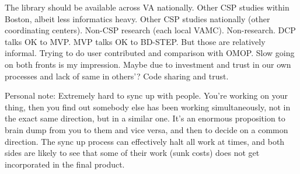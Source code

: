 \documentclass{tufte-handout}
\begin{document}
The library should be available across VA nationally. Other CSP
studies within Boston, albeit less informatics heavy. Other CSP
studies nationally (other coordinating centers). Non-CSP research
(each local VAMC). Non-research. DCP talks OK to MVP. MVP talks OK to
BD-STEP. But those are relatively informal. Trying to do user
contributed and comparison with OMOP. Slow going on both fronts is my
impression. Maybe due to investment and trust in our own processes and
lack of same in others'? Code sharing and trust.

Personal note: Extremely hard to sync up with people. You're working
on your thing, then you find out somebody else has been working
simultaneously, not in the exact same direction, but in a similar one.
It's an enormous proposition to brain dump from you to them and vice
versa, and then to decide on a common direction. The sync up process
can effectively halt all work at times, and both sides are likely to
see that some of their work (sunk costs) does not get incorporated in
the final product.
\end{document}
